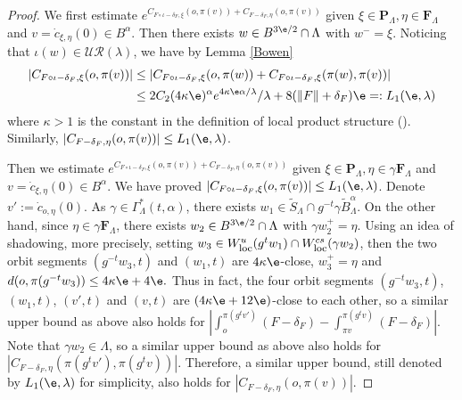 \documentclass[11pt]{amsart}
\theoremstyle{definition}
\newcommand{\UR}{\mathcal{UR}}
\def\loc{{\mathop{\hbox{\footnotesize  \rm loc}}}}
\def\a{\alpha}
\def\c{\gamma}   \def\C{\Gamma}
\def\d{\delta}   %
\def\l{\lambda}   \def\L{\Lambda}
\def\bP{\textbf{P}}
\def\bF{\textbf{F}}
\begin{document}
\begin{proof}
We first estimate $e^{C_{F\circ \iota-\d_F,\xi}(o, \pi(v))+C_{F-\d_F,\eta}(o, \pi(v))}$ given $\xi\in \bP_\L, \eta\in \bF_\L$ and $v=\dot c_{\xi,\eta}(0)\in B^\a$.
Then there exists $w\in B^{3\e/2}\cap\L$ with $w^-=\xi$. Noticing that $\iota(w)\in \UR(\l)$, we have by Lemma \ref{Bowen}
\begin{equation*}
\begin{aligned}
|C_{F\circ \iota-\d_F,\xi}(o, \pi(v))|&\le |C_{F\circ \iota-\d_F,\xi}(o, \pi(w))+C_{F\circ \iota-\d_F,\xi}(\pi(w), \pi(v))|\\
&\le 2C_2(4\kappa\e)^\a e^{4\kappa\e\a/\l}/\l+8(\|F\|+\d_F)\e=:L_1(\e,\l)
\end{aligned}
\end{equation*}
where $\kappa>1$ is the constant in the definition of local product structure (\cite[Definition 4.2]{BCFT}). Similarly, $|C_{F-\d_F,\eta}(o, \pi(v))|\le L_1(\e,\l)$.

Then we estimate $e^{C_{F\circ \iota-\d_F,\xi}(o, \pi(v))+C_{F-\d_F,\eta}(o, \pi(v))}$ given $\xi\in \bP_\L, \eta\in \c\bF_\L$ and $v=\dot c_{\xi,\eta}(0)\in B^\a$. We have proved $|C_{F\circ \iota-\d_F,\xi}(o, \pi(v))|\le  L_1(\e,\l)$. 
 Denote $v':=\dot c_{o,\eta}(0)$. As $\c\in  \C^*_{\L}(t,\a)$, there exists $w_1\in \tilde S_\L\cap g^{-t}\c\tilde B^\a_\L$. On the other hand, since $\eta\in\c \bF_\L$, there exists $w_2\in  B^{3\e/2}\cap \L$ with $\c w_2^+=\eta$. Using an idea of shadowing, more precisely, setting $w_3\in W_\loc^u(g^tw_1)\cap W^{cs}_\loc(\c w_2)$, then the two orbit segments $(g^{-t}w_3,t)$ and $(w_1,t)$ are $4\kappa\e$-close, $w_3^+=\eta$ and $d(o, \pi(g^{-t}w_3))\le 4\kappa\e+4\e.$ 
Thus in fact, the four orbit segments $(g^{-t}w_3,t)$, $(w_1,t)$, $(v', t)$ and $(v,t)$ are $(4\kappa\e+12\e)$-close to each other, so a similar upper bound as above also holds for $|\int_o^{\pi (g^tv')}(F-\d_F)-\int_{\pi v}^{\pi(g^tv)}(F-\d_F)|$. Note that $\c w_2\in \L$, so a similar upper bound as above also holds for $|C_{F-\d_F,\eta}(\pi(g^tv'), \pi(g^tv))|$. Therefore, a similar upper bound, still denoted by $L_1(\e,\l)$ for simplicity, also holds for $|C_{F-\d_F,\eta}(o, \pi(v))|$.


\end{proof}
\end{document}
